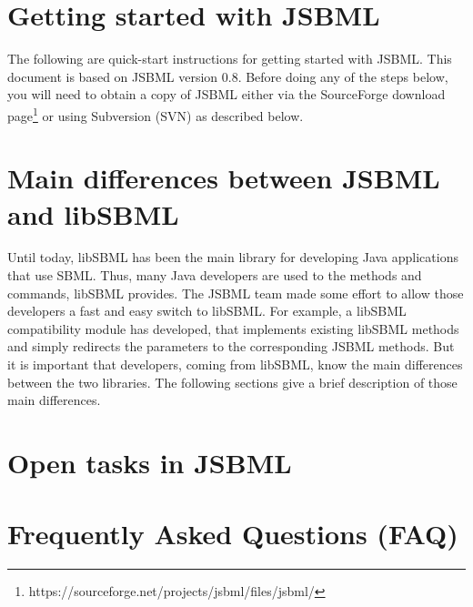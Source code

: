 \documentclass[
  BCOR12mm,
  letterpaper,
  11pt,
  headsepline,
  pointlessnumbers,
  tablecaptionabove,
  onelinecaption,
  headinclude,
  appendixprefix,
  idxtotoc,
  bibtotoc,
  twoside,
  titlepage
]{scrreprt}
\begin{document}
\tableofcontents

\chapter{Getting started with JSBML}

The following are quick-start instructions for getting started with JSBML. This
document is based on JSBML version $0.8$. Before doing any of the steps below,
you will need to obtain a copy of JSBML either via the SourceForge download
page\footnote{https://sourceforge.net/projects/jsbml/files/jsbml/} or using
Subversion (SVN) as described below.





\chapter{Main differences between JSBML and libSBML}

Until today, libSBML has been the main library for developing Java applications
that use SBML. Thus, many Java developers are used to the methods and commands,
libSBML provides. The JSBML team made some effort to allow those developers a
fast and easy switch to libSBML. For example, a libSBML compatibility module has
developed, that implements existing libSBML methods and simply redirects the
parameters to the corresponding JSBML methods. But it is important that
developers, coming from libSBML, know the main differences between the two
libraries. The following sections give a brief description of those main
differences.



\chapter{Open tasks in JSBML}



\appendix

\chapter{Frequently Asked Questions (FAQ)}







\printindex
\end{document}
